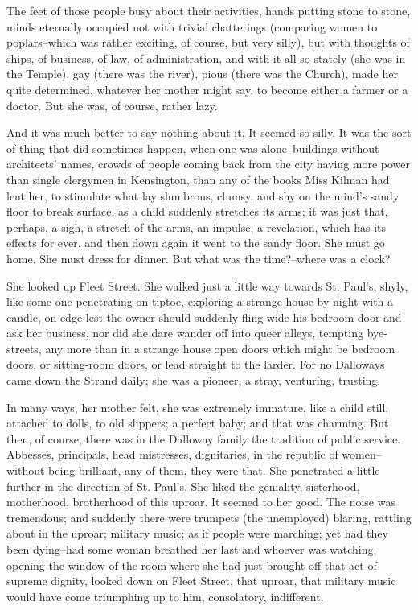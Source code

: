 \documentclass[lang=cn,10pt]{elegantbook}
\begin{document}
The feet of those people busy about their activities, hands putting
stone to stone, minds eternally occupied not with trivial
chatterings (comparing women to poplars--which was rather exciting,
of course, but very silly), but with thoughts of ships, of
business, of law, of administration, and with it all so stately
(she was in the Temple), gay (there was the river), pious (there
was the Church), made her quite determined, whatever her mother
might say, to become either a farmer or a doctor.  But she was, of
course, rather lazy.

And it was much better to say nothing about it.  It seemed so
silly.  It was the sort of thing that did sometimes happen, when
one was alone--buildings without architects' names, crowds of
people coming back from the city having more power than single
clergymen in Kensington, than any of the books Miss Kilman had lent
her, to stimulate what lay slumbrous, clumsy, and shy on the mind's
sandy floor to break surface, as a child suddenly stretches its
arms; it was just that, perhaps, a sigh, a stretch of the arms, an
impulse, a revelation, which has its effects for ever, and then
down again it went to the sandy floor.  She must go home.  She must
dress for dinner.  But what was the time?--where was a clock?

She looked up Fleet Street.  She walked just a little way towards
St. Paul's, shyly, like some one penetrating on tiptoe, exploring a
strange house by night with a candle, on edge lest the owner should
suddenly fling wide his bedroom door and ask her business, nor did
she dare wander off into queer alleys, tempting bye-streets, any
more than in a strange house open doors which might be bedroom
doors, or sitting-room doors, or lead straight to the larder.  For
no Dalloways came down the Strand daily; she was a pioneer, a
stray, venturing, trusting.

In many ways, her mother felt, she was extremely immature, like a
child still, attached to dolls, to old slippers; a perfect baby;
and that was charming.  But then, of course, there was in the
Dalloway family the tradition of public service.  Abbesses,
principals, head mistresses, dignitaries, in the republic of women--
without being brilliant, any of them, they were that.  She
penetrated a little further in the direction of St. Paul's.  She
liked the geniality, sisterhood, motherhood, brotherhood of this
uproar.  It seemed to her good.  The noise was tremendous; and
suddenly there were trumpets (the unemployed) blaring, rattling
about in the uproar; military music; as if people were marching;
yet had they been dying--had some woman breathed her last and
whoever was watching, opening the window of the room where she had
just brought off that act of supreme dignity, looked down on Fleet
Street, that uproar, that military music would have come triumphing
up to him, consolatory, indifferent.
\end{document}
